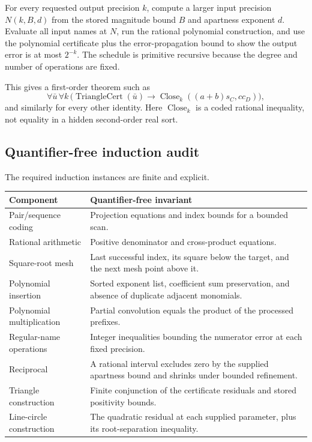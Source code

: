 \documentclass[11pt,letterpaper]{article}
\theoremstyle{definition}
\theoremstyle{remark}
\begin{document}
For every requested output precision \(k\), compute a larger input precision
\(N(k,B,d)\) from the stored magnitude bound \(B\) and apartness exponent
\(d\).  Evaluate all input names at \(N\), run the rational polynomial
construction, and use the polynomial certificate plus the error-propagation
bound to show the output error is at most \(2^{-k}\).  The schedule is
primitive recursive because the degree and number of operations are fixed.

This gives a first-order theorem such as
\[
 \forall\bar u\,\forall k\,
 \bigl(\operatorname{TriangleCert}(\bar u)
 \to \operatorname{Close}_k((a+b)s_C,cc_D)\bigr),
 \tag{9.2}\label{eq:name-schema}
\]
and similarly for every other identity.  Here \(\operatorname{Close}_k\) is a
coded rational inequality, not equality in a hidden second-order real sort.

\subsection{Quantifier-free induction audit}

The required induction instances are finite and explicit.

\begin{longtable}{p{}p{}}
\toprule
Component & Quantifier-free invariant \\
\midrule
\endhead
Pair/sequence coding & Projection equations and index bounds for a bounded
scan. \\
Rational arithmetic & Positive denominator and cross-product equations. \\
Square-root mesh & Last successful index, its square below the target, and the
next mesh point above it. \\
Polynomial insertion & Sorted exponent list, coefficient sum preservation,
and absence of duplicate adjacent monomials. \\
Polynomial multiplication & Partial convolution equals the product of the
processed prefixes. \\
Regular-name operations & Integer inequalities bounding the numerator error at
each fixed precision. \\
Reciprocal & A rational interval excludes zero by the supplied apartness bound
and shrinks under bounded refinement. \\
Triangle construction & Finite conjunction of the certificate residuals and
stored positivity bounds. \\
Line-circle construction & The quadratic residual at each supplied parameter,
plus its root-separation inequality. \\
\bottomrule
\end{longtable}
\end{document}
